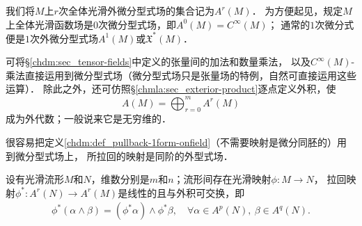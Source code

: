 我们将$M$上$r$次全体光滑外微分型式场的集合记为$A^r(M)$．
为方便起见，规定$M$上全体光滑函数场是$0$次微分型式场，即$A^0(M)=C^\infty(M)$；
通常的$1$次微分式便是$1$次外微分型式场$A^1(M)$或$\mathfrak{X}^{*}(M)$．


可将\S \ref{chdm:sec_tensor-fields}中定义的张量间的加法和数量乘法，
以及$C^\infty(M)$-乘法直接运用到微分型式场（微分型式场只是张量场的特例，自然可直接运用这些运算）．
除此之外，还可仿照\S \ref{chmla:sec_exterior-product}逐点定义外积，使
\begin{equation}
    A(M)= \bigoplus_{r=0}^{m} A^r(M)
\end{equation}
成为{\heiti 外代数}；一般说来它是无穷维的．

很容易把定义\ref{chdm:def_pullback-1form-onfield}（不需要映射是微分同胚的）用到微分型式场上，
所拉回的映射是同阶的外型式场．
\begin{theorem}\label{chdf:thm_dfs-fsd}
    设有光滑流形$M$和$N$，维数分别是$m$和$n$；流形间存在光滑映射$\phi:M\to N$，
    拉回映射$\phi^*: A^r(N) \to A^r(M)$是线性的且与外积可交换，即
    \begin{align*}
        \phi^{*} (\alpha \wedge \beta ) = (\phi^{*}\alpha) \wedge \phi^{*}\beta,
        \quad \forall \alpha \in A^p(N), \ \beta \in A^q(N).
    \end{align*}
\end{theorem}
